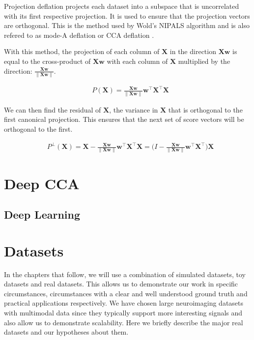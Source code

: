 Projection deflation projects each dataset into a subspace that is uncorrelated with its first respective projection. It is used to ensure that the projection vectors are orthogonal. This is the method used by Wold's NIPALS algorithm and is also refered to as mode-A deflation or CCA deflation \cite{mackey2009deflation}.

With this method, the projection of each column of $\mathbf{X}$ in the direction $\mathbf{Xw}$ is equal to the cross-product of $\mathbf{Xw}$ with each column of $\mathbf{X}$ multiplied by the direction: $\frac{\mathbf{Xw}}{\|\mathbf{Xw}\|}$.

\begin{align}
     & P(\mathbf{X})= \frac{\mathbf{Xw}}{\|\mathbf{Xw}\|}\mathbf{w^{\top}X^{\top}X}
\end{align}

We can then find the residual of $\mathbf{X}$, the variance in $\mathbf{X}$  that is orthogonal to the first canonical projection. This ensures that the next set of score vectors will be orthogonal to the first.

\begin{align}
     & P^\perp(\mathbf{X})= \mathbf{X} - \frac{\mathbf{Xw}}{\|\mathbf{Xw}\|}\mathbf{w^{\top}X^{\top}X} = (I - \frac{\mathbf{Xw}}{\|\mathbf{Xw}\|}\mathbf{w^{\top}X^{\top})X}
\end{align}

\section{Deep CCA}\label{sec:DCCA}
\subsection{Deep Learning}



\section{Datasets}

In the chapters that follow, we will use a combination of simulated datasets, toy datasets and real datasets. This allows us to demonstrate our work in specific circumstances, circumstances with a clear and well understood ground truth and practical applications respectively. We have chosen large neuroimaging datasets with multimodal data since they typically support more interesting signals and also allow us to demonstrate scalability. Here we briefly describe the major real datasets and our hypotheses about them.





